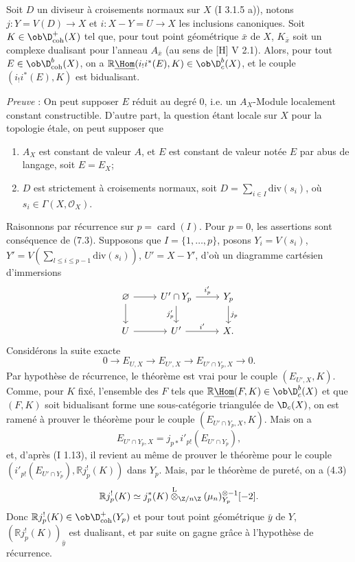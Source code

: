 Soit $D$ un diviseur à croisements normaux sur $X$ (I 3.1.5 a)), notons $j:Y=V(D)\to X$ et $i:X-Y=U\to X$ les inclusions canoniques. Soit $K\in\ob\D^{+}_{\mathrm{coh}}(X)$ tel que, pour tout point géométrique $\bar{x}$ de $X$, $K_{\bar{x}}$ soit un complexe dualisant pour l'anneau $A_{\bar{x}}$ (au sens de [H] V 2.1). Alors, pour tout $E\in\ob\D^{b}_{\mathrm{coh}}(X)$, on a $\mathbb{R}\underline{\Hom}(i_!i^*(E),K)\in\ob\D^{b}_{c}(X)$, et le couple $(i_!i^*(E),K)$ est bidualisant.

\emph{Preuve} : On peut supposer $E$ réduit au degré $0$, i.e. un $A_X$-Module localement constant constructible. D'autre part, la question étant locale sur $X$ pour la topologie étale, on peut supposer que
\begin{enumerate}[label=(\alph*)]
\item $A_X$ est constant de valeur $A$, et $E$ est constant de valeur notée $E$ par abus de langage, soit $E=E_X$;
\item $D$ est strictement à croisements normaux, soit $D=\sum_{i\in I}\mathrm{div}(s_i)$, où $s_i\in\Gamma(X,\mathcal{O}_X)$.
\end{enumerate}
Raisonnons par récurrence sur $p=\operatorname{card}(I)$. Pour $p=0$, les assertions sont conséquence de (7.3). Supposons que $I=\{1,\ldots,p\}$, posons $Y_i=V(s_i)$, $Y'=V(\sum_{l\leq i\leq p-1}\mathrm{div}(s_i))$, $U'=X-Y'$, d'où un diagramme cartésien d'immersions
\[
\begin{tikzcd}
\varnothing \arrow[r] \arrow[d] & U'\cap Y_p \arrow[r,"i'_p"] \arrow[d,"j'_p"'] & Y_p \arrow[d,"j_p"]\\
U \arrow[r] & U' \arrow[r,"i'"] & X.
\end{tikzcd}
\]
Considérons la suite exacte
\[
        0\longrightarrow E_{U,X}\longrightarrow E_{U',X}\longrightarrow E_{U'\cap Y_p,X}\longrightarrow0.
\]
Par hypothèse de
récurrence, le théorème est vrai pour le couple $(E_{U',X},K)$. Comme, pour $K$ fixé, l'ensemble des $F$ tels que $\mathbb{R}\underline{\Hom}(F,K)\in\ob\D_c^b(X)$ et que $(F,K)$ soit bidualisant forme une sous-catégorie triangulée de $\D_c(X)$, on est ramené à prouver le théorème pour le couple $(E_{U'\cap Y_p,X},K)$. Mais on a
\[
        E_{U'\cap Y_p,X}=j_{p*}i'_{p!}(E_{U'\cap Y_p}),
\]
et, d'après (I 1.13), il revient au même de prouver le théorème pour le couple $(i'_{p!}(E_{U'\cap Y_p}),\mathbb{R} j_p^!(K))$ dans $Y_p$. Mais, par le théorème de pureté, on a (4.3)
\[
        \mathbb{R} j_p^!(K)\simeq j_p^*(K)\overset{\mathrm{L}}{\otimes}_{\Z/n\Z}(\mu_n)_{Y_p}^{\otimes -1}[-2].
\]
Donc $\mathbb{R} j_p^!(K)\in\ob\D^{+}_{\mathrm{coh}}(Y_p)$ et pour tout point géométrique $\bar{y}$ de $Y$, $(\mathbb{R} j_p^!(K))_{\bar{y}}$ est dualisant, et par suite on gagne grâce à l'hypothèse de récurrence.

